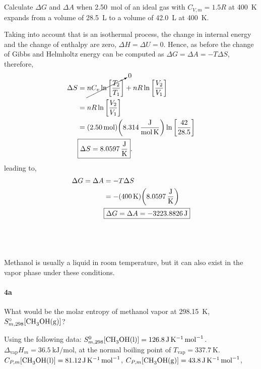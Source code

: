 \documentclass[main.tex]{subfiles}
\begin{document}
\subsection{~}

Calculate $\Delta G$ and $\Delta A$ when \SI{2.50}{\mole} of an ideal gas with $C_{V,m}=1.5R$ at \SI{400}{\kelvin} expands from a volume of \SI{28.5}{\liter} to a volume of \SI{42.0}{\liter} at \SI{400}{\kelvin}.

Taking into account that is an isothermal process, the change in internal energy and the change of enthalpy are zero, $\Delta H = \Delta U =0$.
Hence, as before the change of Gibbs and Helmholtz energy can be computed as $\Delta G=\Delta A =-T\Delta S$, therefore,
\begin{align*}
    \Delta S &= \cancelto{0}{nC_v\ln\qty[\frac{T_2}{T_1}]} + nR\ln\qty[\frac{V_2}{V_1}] \\
    &= nR\ln\qty[\frac{V_2}{V_1}] \\
    &= \qty(\SI{2.50}{\mole})\qty(\SI[per-mode=fraction]{8.314}{\joule\per\mole\per\kelvin})\ln\qty[\frac{42}{28.5}] \\
    &\boxed{\Delta S=\SI[per-mode=fraction]{8.0597}{\joule\per\kelvin}}.
\end{align*}
leading to,
\begin{align*}
    \Delta G = \Delta A &= -T\Delta S \\
    &= -\qty(\SI{400}{\kelvin})\qty(\SI[per-mode=fraction]{8.0597}{\joule\per\kelvin}) \\
    &\boxed{\Delta G = \Delta A = -\SI{3223.8826}{\joule}}
\end{align*}

\subsection{~}
Methanol is usually a liquid in room temperature, but it can also exist in the vapor phase under these conditions.

\paragraph{4a} What would be the molar entropy of methanol vapor at \SI{298.15}{\kelvin}, $S_{m,298}^{\circ}[\mathrm{\ce{CH3OH(g)}}]$?

Using the following data: $S_{m,298}^{0}[\mathrm{\ce{CH3OH(l)}}]=\SI{126.8}{\joule\per\kelvin\per\mole}$.
$\Delta_\mathrm{vap}H_m=\SI{36.5}{\kilo\joule\per\mole}$, at the normal boiling point of $T_\mathrm{vap}=\SI{337.7}{\kelvin}$.
$C_{P,m}[\mathrm{\ce{CH3OH(l)}}]=\SI{81.12}{\joule\per\kelvin\per\mole}$, 
$C_{P,m}[\mathrm{\ce{CH3OH(g)}}]=\SI{43.8}{\joule\per\kelvin\per\mole}$, 
\end{document}
